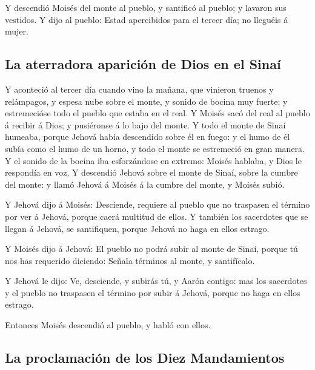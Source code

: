  Y descendió Moisés del monte al pueblo, y santificó al
pueblo; y lavaron sus vestidos.  Y dijo al pueblo: Estad
apercibidos para el tercer día; no lleguéis á mujer.

\hypertarget{la-aterradora-apariciuxf3n-de-dios-en-el-sinauxed}{%
\subsection{La aterradora aparición de Dios en el
Sinaí}\label{la-aterradora-apariciuxf3n-de-dios-en-el-sinauxed}}

 Y aconteció al tercer día cuando vino la mañana, que
vinieron truenos y relámpagos, y espesa nube sobre el monte, y sonido de
bocina muy fuerte; y estremecióse todo el pueblo que estaba en el real.
 Y Moisés sacó del real al pueblo á recibir á Dios; y
pusiéronse á lo bajo del monte.  Y todo el monte de Sinaí
humeaba, porque Jehová había descendido sobre él en fuego: y el humo de
él subía como el humo de un horno, y todo el monte se estremeció en gran
manera.  Y el sonido de la bocina iba esforzándose en
extremo: Moisés hablaba, y Dios le respondía en voz.  Y
descendió Jehová sobre el monte de Sinaí, sobre la cumbre del monte: y
llamó Jehová á Moisés á la cumbre del monte, y Moisés subió.

 Y Jehová dijo á Moisés: Desciende, requiere al pueblo
que no traspasen el término por ver á Jehová, porque caerá multitud de
ellos.  Y también los sacerdotes que se llegan á Jehová,
se santifiquen, porque Jehová no haga en ellos estrago.

 Y Moisés dijo á Jehová: El pueblo no podrá subir al
monte de Sinaí, porque tú nos has requerido diciendo: Señala términos al
monte, y santifícalo.

 Y Jehová le dijo: Ve, desciende, y subirás tú, y Aarón
contigo: mas los sacerdotes y el pueblo no traspasen el término por
subir á Jehová, porque no haga en ellos estrago.

 Entonces Moisés descendió al pueblo, y habló con ellos.

\hypertarget{la-proclamaciuxf3n-de-los-diez-mandamientos}{%
\subsection{La proclamación de los Diez
Mandamientos}\label{la-proclamaciuxf3n-de-los-diez-mandamientos}}


